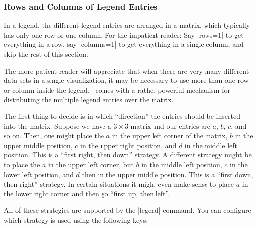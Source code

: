 \subsubsection{Rows and Columns of Legend Entries}

In a legend, the different legend entries are arranged in a matrix, which
typically has only one row or one column. For the impatient reader: Say
|rows=1| to get everything in a row, say |columns=1| to get everything in a
single column, and skip the rest of this section.

The more patient reader will appreciate that when there are very many different
data sets in a single visualization, it may be necessary to use more than one
row or column inside the legend. \tikzname\ comes with a rather powerful
mechanism for distributing the multiple legend entries over the matrix.

The first thing to decide is in which ``direction'' the entries should be
inserted into the matrix. Suppose we have a $3 \times 3$ matrix and our entries
are $a$, $b$, $c$, and so on. Then, one might place the $a$ in the upper left
corner of the matrix, $b$ in the upper middle position, $c$ in the upper right
position, and $d$ in the middle left position. This is a ``first right, then
down'' strategy. A different strategy might be to place the $a$ in the upper
left corner, but $b$ in the middle left position, $c$ in the lower left
position, and $d$ then in the upper middle position. This is a ``first down,
then right'' strategy. In certain situations it might even make sense to place
$a$ in the lower right corner and then go ``first up, then left''.

All of these strategies are supported by the |legend| command. You can
configure which strategy is used using the following keys:


